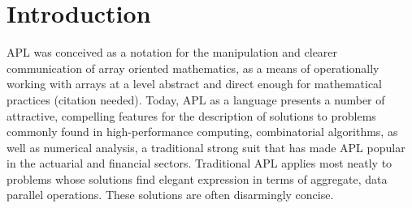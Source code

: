 \section{Introduction}

APL was conceived as a notation for the manipulation and clearer 
communication of array oriented mathematics, as a means of operationally 
working with arrays at a level abstract and direct enough for 
mathematical practices (citation needed). Today, APL as a language 
presents a number of attractive, compelling features for the description 
of solutions to problems commonly found in high-performance computing, 
combinatorial algorithms, as well as numerical analysis, a traditional 
strong suit that has made APL popular in the actuarial and financial 
sectors. Traditional APL applies most neatly to problems whose solutions 
find elegant expression in terms of aggregate, data parallel operations. 
These solutions are often disarmingly concise.
